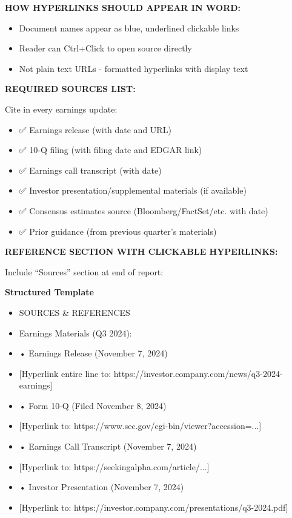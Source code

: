 \documentclass[11pt]{article}
\begin{document}
\textbf{HOW HYPERLINKS SHOULD APPEAR IN WORD:}

\begin{itemize}[leftmargin=*,itemsep=2pt,topsep=2pt]
\item {} Document names appear as blue, underlined clickable links
\item {} Reader can Ctrl+Click to open source directly
\item {} Not plain text URLs - formatted hyperlinks with display text
\end{itemize}

\textbf{REQUIRED SOURCES LIST:}


Cite in every earnings update:

\begin{itemize}[leftmargin=*,itemsep=2pt,topsep=2pt]
\item {} ✅ Earnings release (with date and URL)
\item {} ✅ 10-Q filing (with filing date and EDGAR link)
\item {} ✅ Earnings call transcript (with date)
\item {} ✅ Investor presentation/supplemental materials (if available)
\item {} ✅ Consensus estimates source (Bloomberg/FactSet/etc. with date)
\item {} ✅ Prior guidance (from previous quarter's materials)
\end{itemize}

\textbf{REFERENCE SECTION WITH CLICKABLE HYPERLINKS:}


Include ``Sources'' section at end of report:


\textbf{Structured Template}
\begin{itemize}[leftmargin=*,itemsep=2pt,topsep=2pt]
\item {} SOURCES \& REFERENCES
\item {} Earnings Materials (Q3 2024):
\item {} • Earnings Release (November 7, 2024)
\item {} [Hyperlink entire line to: https://investor.company.com/news/q3-2024-earnings]
\item {} • Form 10-Q (Filed November 8, 2024)
\item {} [Hyperlink to: https://www.sec.gov/cgi-bin/viewer?accession=...]
\item {} • Earnings Call Transcript (November 7, 2024)
\item {} [Hyperlink to: https://seekingalpha.com/article/...]
\item {} • Investor Presentation (November 7, 2024)
\item {} [Hyperlink to: https://investor.company.com/presentations/q3-2024.pdf]
\end{itemize}
\end{document}
